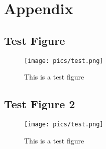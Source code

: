 \chapter{Appendix}\label{chapter:Appendix}

\section{Test Figure}
\begin{figure}[ht]
	\centering
	\label{fig:tesfigure}
	\texttt{[image: pics/test.png]}
    \caption[Test Figure]{This is a test figure}
\end{figure}

\section{Test Figure 2}
\begin{figure}[ht]
	\centering
	\label{fig:blafigure}
	\texttt{[image: pics/test.png]}
    \caption[Test Figure 2]{This is a test figure}
\end{figure}
